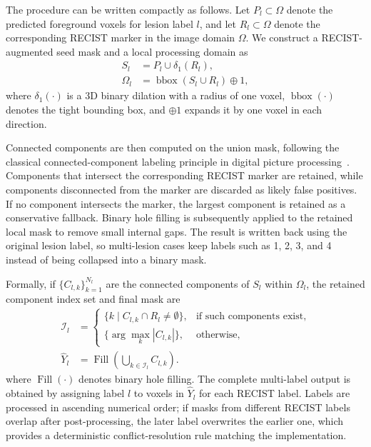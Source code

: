 \documentclass[runningheads]{llncs}
\begin{document}
The procedure can be written compactly as follows. Let $P_l \subset \Omega$ denote the predicted foreground voxels for lesion label $l$, and let $R_l \subset \Omega$ denote the corresponding RECIST marker in the image domain $\Omega$. We construct a RECIST-augmented seed mask and a local processing domain as
\begin{align}
S_l &= P_l \cup \delta_1(R_l), \label{eq:seed_union}\\
\Omega_l &= \operatorname{bbox}\left(S_l \cup R_l\right) \oplus 1, \label{eq:local_box}
\end{align}
where $\delta_1(\cdot)$ is a 3D binary dilation with a radius of one voxel, $\operatorname{bbox}(\cdot)$ denotes the tight bounding box, and $\oplus 1$ expands it by one voxel in each direction.

Connected components are then computed on the union mask, following the classical connected-component labeling principle in digital picture processing~\cite{RosenfeldPfaltz1966}. Components that intersect the corresponding RECIST marker are retained, while components disconnected from the marker are discarded as likely false positives. If no component intersects the marker, the largest component is retained as a conservative fallback. Binary hole filling is subsequently applied to the retained local mask to remove small internal gaps. The result is written back using the original lesion label, so multi-lesion cases keep labels such as 1, 2, 3, and 4 instead of being collapsed into a binary mask.

Formally, if $\{C_{l,k}\}_{k=1}^{N_l}$ are the connected components of $S_l$ within $\Omega_l$, the retained component index set and final mask are
\begin{align}
\mathcal{I}_l &=
\begin{cases}
\{k \mid C_{l,k}\cap R_l \neq \emptyset\}, & \text{if such components exist},\\
\{\arg\max_k |C_{l,k}|\}, & \text{otherwise},
\end{cases}
\label{eq:component_selection}\\
\hat{Y}_l &= \operatorname{Fill}\left(\bigcup_{k\in\mathcal{I}_l} C_{l,k}\right).
\label{eq:final_mask}
\end{align}
where $\operatorname{Fill}(\cdot)$ denotes binary hole filling. The complete multi-label output is obtained by assigning label $l$ to voxels in $\hat{Y}_l$ for each RECIST label. Labels are processed in ascending numerical order; if masks from different RECIST labels overlap after post-processing, the later label overwrites the earlier one, which provides a deterministic conflict-resolution rule matching the implementation.
\end{document}
